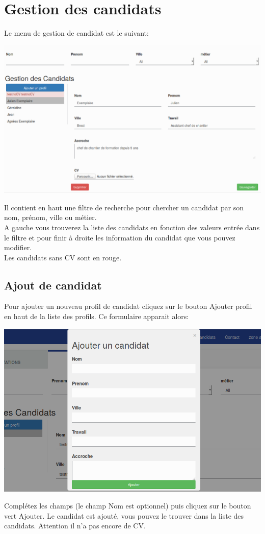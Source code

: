 \documentclass[a4paper, 12pt]{report}
\begin{document}
\section{Gestion des candidats}
Le menu de gestion de candidat est le suivant:
\begin{center}
\includegraphics[width=16cm]{candidatsAdmin.png}
\end{center}
Il contient en haut une filtre de recherche pour chercher un candidat par son nom, prénom, ville ou métier.\\
A gauche vous trouverez la liste des candidats en fonction des valeurs entrée dans le filtre et pour finir à droite les information du candidat que vous pouvez modifier.\\
Les candidats sans CV sont en rouge.

\subsection{Ajout de candidat}
Pour ajouter un nouveau profil de candidat cliquez sur le bouton Ajouter profil en haut de la liste des profils. Ce formulaire apparait alors:
\begin{center}
\includegraphics[width=16cm]{candidatsAdd.png}
\end{center}
Complétez les champs (le champ Nom est optionnel) puis cliquez sur le bouton vert Ajouter.
Le candidat est ajouté, vous pouvez le trouver dans la liste des candidats. Attention il n'a pas encore de CV.
\end{document}
